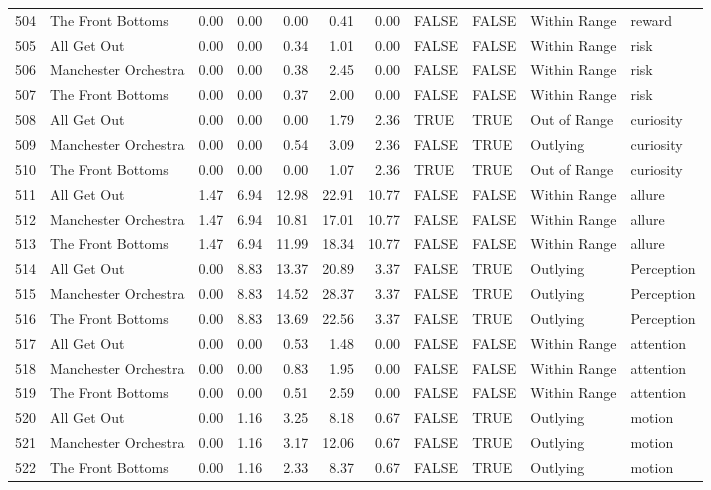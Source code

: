 \begin{table}[ht]
\begin{tabular}{rlrrrrrllll}
  504 & The Front Bottoms & 0.00 & 0.00 & 0.00 & 0.41 & 0.00 & FALSE & FALSE & Within Range & reward \\ 
  505 & All Get Out & 0.00 & 0.00 & 0.34 & 1.01 & 0.00 & FALSE & FALSE & Within Range & risk \\ 
  506 & Manchester Orchestra & 0.00 & 0.00 & 0.38 & 2.45 & 0.00 & FALSE & FALSE & Within Range & risk \\ 
  507 & The Front Bottoms & 0.00 & 0.00 & 0.37 & 2.00 & 0.00 & FALSE & FALSE & Within Range & risk \\ 
  508 & All Get Out & 0.00 & 0.00 & 0.00 & 1.79 & 2.36 & TRUE & TRUE & Out of Range & curiosity \\ 
  509 & Manchester Orchestra & 0.00 & 0.00 & 0.54 & 3.09 & 2.36 & FALSE & TRUE & Outlying & curiosity \\ 
  510 & The Front Bottoms & 0.00 & 0.00 & 0.00 & 1.07 & 2.36 & TRUE & TRUE & Out of Range & curiosity \\ 
  511 & All Get Out & 1.47 & 6.94 & 12.98 & 22.91 & 10.77 & FALSE & FALSE & Within Range & allure \\ 
  512 & Manchester Orchestra & 1.47 & 6.94 & 10.81 & 17.01 & 10.77 & FALSE & FALSE & Within Range & allure \\ 
  513 & The Front Bottoms & 1.47 & 6.94 & 11.99 & 18.34 & 10.77 & FALSE & FALSE & Within Range & allure \\ 
  514 & All Get Out & 0.00 & 8.83 & 13.37 & 20.89 & 3.37 & FALSE & TRUE & Outlying & Perception \\ 
  515 & Manchester Orchestra & 0.00 & 8.83 & 14.52 & 28.37 & 3.37 & FALSE & TRUE & Outlying & Perception \\ 
  516 & The Front Bottoms & 0.00 & 8.83 & 13.69 & 22.56 & 3.37 & FALSE & TRUE & Outlying & Perception \\ 
  517 & All Get Out & 0.00 & 0.00 & 0.53 & 1.48 & 0.00 & FALSE & FALSE & Within Range & attention \\ 
  518 & Manchester Orchestra & 0.00 & 0.00 & 0.83 & 1.95 & 0.00 & FALSE & FALSE & Within Range & attention \\ 
  519 & The Front Bottoms & 0.00 & 0.00 & 0.51 & 2.59 & 0.00 & FALSE & FALSE & Within Range & attention \\ 
  520 & All Get Out & 0.00 & 1.16 & 3.25 & 8.18 & 0.67 & FALSE & TRUE & Outlying & motion \\ 
  521 & Manchester Orchestra & 0.00 & 1.16 & 3.17 & 12.06 & 0.67 & FALSE & TRUE & Outlying & motion \\ 
  522 & The Front Bottoms & 0.00 & 1.16 & 2.33 & 8.37 & 0.67 & FALSE & TRUE & Outlying & motion \\ 

\end{tabular}
\end{table}
